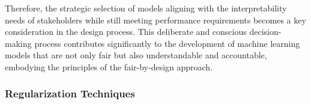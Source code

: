 \begin{itemize}
\begin{itemize}
        Therefore, the strategic selection of models aligning with the interpretability needs of stakeholders while still meeting performance requirements becomes a key consideration in the design process. This deliberate and conscious decision-making process contributes significantly to the development of machine learning models that are not only fair but also understandable and accountable, embodying the principles of the fair-by-design approach.

    \end{itemize}

\end{itemize}

\subsubsection{Regularization Techniques}

